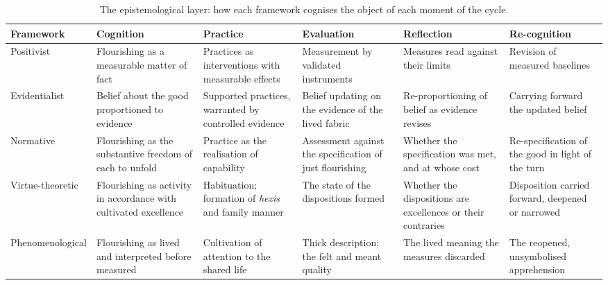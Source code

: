 \begin{table}[t]
\centering
\scriptsize
\renewcommand{\arraystretch}{1.3}
\caption{The epistemological layer: how each framework cognises the object of each moment of the cycle.}
\label{p11:tab:matrix-epistemic}
\begin{tabularx}{\linewidth}{@{}>{\raggedright\arraybackslash}p{1.7cm} >{\raggedright\arraybackslash}X >{\raggedright\arraybackslash}X >{\raggedright\arraybackslash}X >{\raggedright\arraybackslash}X >{\raggedright\arraybackslash}X@{}}
\toprule
\rowcolor{pageblush}
\textbf{\textcolor{rosedeep}{Framework}} & \textbf{\textcolor{rosedeep}{Cognition}} & \textbf{\textcolor{rosedeep}{Practice}} & \textbf{\textcolor{rosedeep}{Evaluation}} & \textbf{\textcolor{rosedeep}{Reflection}} & \textbf{\textcolor{rosedeep}{Re-cognition}} \\
\midrule
Positivist & Flourishing as a measurable matter of fact & Practices as interventions with measurable effects & Measurement by validated instruments & Measures read against their limits & Revision of measured baselines \\
Evidentialist & Belief about the good proportioned to evidence & Supported practices, warranted by controlled evidence & Belief updating on the evidence of the lived fabric & Re-proportioning of belief as evidence revises & Carrying forward the updated belief \\
Normative & Flourishing as the substantive freedom of each to unfold & Practice as the realisation of capability & Assessment against the specification of just flourishing & Whether the specification was met, and at whose cost & Re-specification of the good in light of the turn \\
Virtue-theoretic & Flourishing as activity in accordance with cultivated excellence & Habituation; formation of \emph{hexis} and family manner & The state of the dispositions formed & Whether the dispositions are excellences or their contraries & Disposition carried forward, deepened or narrowed \\
Phenomenological & Flourishing as lived and interpreted before measured & Cultivation of attention to the shared life & Thick description; the felt and meant quality & The lived meaning the measures discarded & The reopened, unsymbolised apprehension \\
\bottomrule
\end{tabularx}
\end{table}

